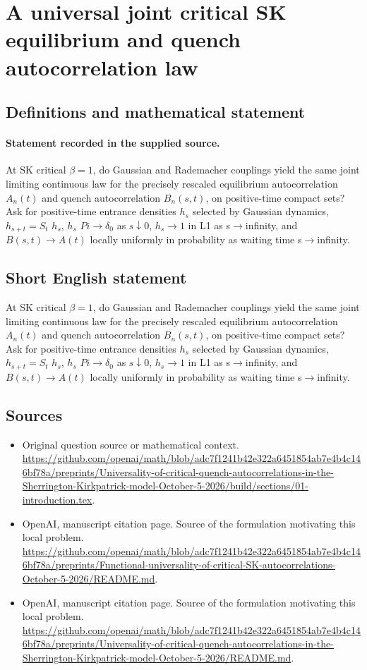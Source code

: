 \documentclass[11pt]{article}
\begin{document}
\section*{A universal joint critical SK equilibrium and quench autocorrelation law}\label{30007388}
\subsection{Definitions and mathematical statement}
\paragraph{Statement recorded in the supplied source.}
At SK critical $\beta =1$, do Gaussian and Rademacher couplings yield the same joint limiting continuous law for the precisely rescaled equilibrium autocorrelation $A_n(t)$ and quench autocorrelation $B_n(s,t)$, on positive-time compact sets? Ask for positive-time entrance densities $h_s$ selected by Gaussian dynamics, $h_{s+t}=S_t$ $h_s$, $h_s$ $Pi\to \delta _0$ as $s\downarrow 0$, $h_s\to 1$ in L1 as s$\to$infinity, and $B(s,t)\to A(t)$ locally uniformly in probability as waiting time s$\to$infinity.
\subsection{Short English statement}
At SK critical $\beta =1$, do Gaussian and Rademacher couplings yield the same joint limiting continuous law for the precisely rescaled equilibrium autocorrelation $A_n(t)$ and quench autocorrelation $B_n(s,t)$, on positive-time compact sets? Ask for positive-time entrance densities $h_s$ selected by Gaussian dynamics, $h_{s+t}=S_t$ $h_s$, $h_s$ $Pi\to \delta _0$ as $s\downarrow 0$, $h_s\to 1$ in L1 as s$\to$infinity, and $B(s,t)\to A(t)$ locally uniformly in probability as waiting time s$\to$infinity.
\subsection{Sources}
\begin{itemize}
\item[S1] Original question source or mathematical context.
\url{https://github.com/openai/math/blob/adc7f1241b42e322a6451854ab7e4b4c146bf78a/preprints/Universality-of-critical-quench-autocorrelations-in-the-Sherrington-Kirkpatrick-model-October-5-2026/build/sections/01-introduction.tex}.
\item[S2] OpenAI, manuscript citation page. Source of the formulation motivating this local problem.
\url{https://github.com/openai/math/blob/adc7f1241b42e322a6451854ab7e4b4c146bf78a/preprints/Functional-universality-of-critical-SK-autocorrelations-October-5-2026/README.md}.
\item[S3] OpenAI, manuscript citation page. Source of the formulation motivating this local problem.
\url{https://github.com/openai/math/blob/adc7f1241b42e322a6451854ab7e4b4c146bf78a/preprints/Universality-of-critical-quench-autocorrelations-in-the-Sherrington-Kirkpatrick-model-October-5-2026/README.md}.
\end{itemize}
\end{document}
